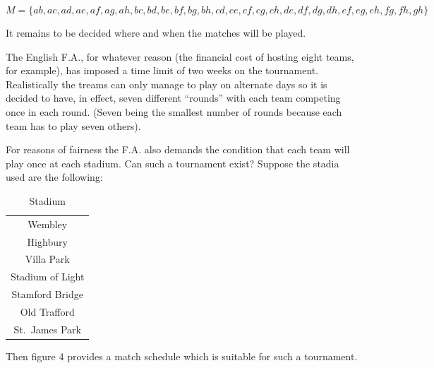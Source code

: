 \documentclass[
  12pt,
  a4paper]{book}
\begin{document}
\[ 
M = \{
  ab,ac,ad,ae,af,ag,ah,bc,bd,be,bf,bg,bh,cd,
  ce,cf,cg,ch,de,df,dg,dh,ef,eg,eh,fg,fh,gh
\}
\]

It remains to be decided where and when the matches will be played.

The English F.A., for whatever reason (the financial cost of hosting
eight teams, for example), has imposed a time limit of two weeks on the
tournament. Realistically the treams can only manage to play on
alternate days so it is decided to have, in effect, seven different
``rounds'' with each team competing once in each round. (Seven being the
smallest number of rounds because each team has to play seven others).

For reasons of fairness the F.A. also demands the condition that each
team will play once at each stadium. Can such a tournament exist?
Suppose the stadia used are the following:

\begin{longtable}[]{@{}c@{}}
\caption{Stadium}\tabularnewline
\toprule
\endhead
\begin{minipage}[t]{0.26\columnwidth}\centering
Wembley\strut
\end{minipage}\tabularnewline
\begin{minipage}[t]{0.26\columnwidth}\centering
Highbury\strut
\end{minipage}\tabularnewline
\begin{minipage}[t]{0.26\columnwidth}\centering
Villa Park\strut
\end{minipage}\tabularnewline
\begin{minipage}[t]{0.26\columnwidth}\centering
Stadium of Light\strut
\end{minipage}\tabularnewline
\begin{minipage}[t]{0.26\columnwidth}\centering
Stamford Bridge\strut
\end{minipage}\tabularnewline
\begin{minipage}[t]{0.26\columnwidth}\centering
Old Trafford\strut
\end{minipage}\tabularnewline
\begin{minipage}[t]{0.26\columnwidth}\centering
St.~James Park\strut
\end{minipage}\tabularnewline
\bottomrule
\end{longtable}

Then figure 4 provides a match schedule which is suitable for such a
tournament.
\end{document}
